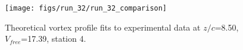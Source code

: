 \begin{figure}[H]
\centering
\texttt{[image: figs/run\_32/run\_32\_comparison]}
\caption{Theoretical vortex profile fits to experimental data at $z/c$=8.50, $V_{free}$=17.39, station 4.}
\label{fig:run_32_comparison}
\end{figure}



